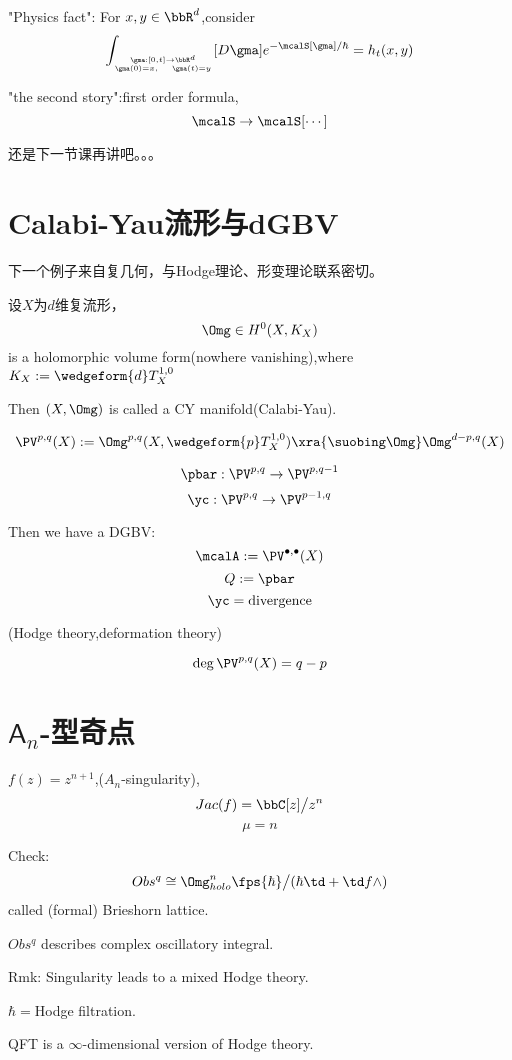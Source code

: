 "Physics fact": For $x,y\in\bbR^d$,consider
$$\int_{\gma:[0,t]\to\bbR^d\atop\gma(0)=x,\quad\gma(t)=y}
[D\gma]e^{-\mcalS[\gma]/\hbar}
=h_t(x,y)$$

"the second story":first order formula,
$$\mcalS\to\mcalS[\cdots]$$

还是下一节课再讲吧。。。

\section{Calabi-Yau流形与dGBV}
下一个例子来自复几何，与Hodge理论、形变理论联系密切。

\begin{example}%
设$X$为$d$维复流形，
$$\Omg\in H^0(X,K_X)$$
is a holomorphic volume form(nowhere vanishing),where
$K_X:=\wedgeform{d}T_X^{1,0}$

Then $(X,\Omg)$ is called a CY manifold(Calabi-Yau).

$$\PV^{p,q}(X):=\Omg^{p,q}(X,\wedgeform{p}T_X^{1,0})
\xra{\suobing\Omg}\Omg^{d-p,q}(X)$$

$$\pbar:\PV^{p,q}\to\PV^{p,q-1}$$
$$\yc:\PV^{p,q}\to\PV^{p-1,q}$$
\end{example}
Then we have a DGBV:
$$\mcalA:=\PV^{\bullet,\bullet}(X)$$
$$Q:=\pbar$$
$$\yc=\text{divergence}$$

(Hodge theory,deformation theory)

$$\deg\PV^{p,q}(X)=q-p$$

\section{$\mathsf{A}_n$-型奇点}
\begin{example}
$f(z)=z^{n+1}$,($A_n$-singularity),
$$Jac(f)=\bbC[z]\big/z^n$$
$$\mu=n$$
\end{example}

Check:
$$Obs^q\cong\Omg_{holo}^n\fps{\hbar}\big/
(\hbar\td+\td f\wedge)$$
called (formal) Brieshorn lattice.

$Obs^q$ describes complex oscillatory integral.

Rmk: Singularity leads to a mixed Hodge theory.

$\hbar=$Hodge filtration.

QFT is a $\infty$-dimensional version of Hodge theory.
